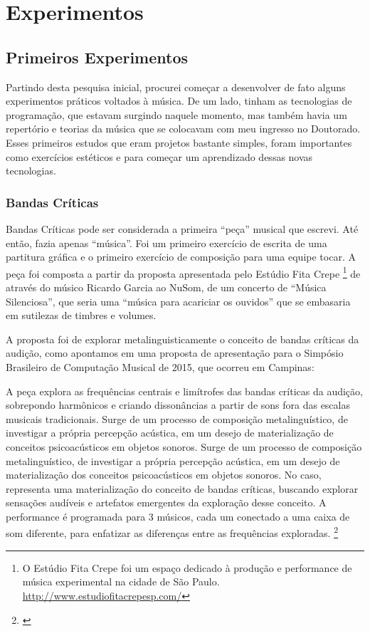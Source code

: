 

\chapter{Experimentos}
\label{ch:experimentos}


\section{Primeiros Experimentos}
Partindo desta pesquisa inicial, procurei começar a desenvolver de fato alguns experimentos práticos voltados à música.  De um lado, tinham as tecnologias de programação, que estavam surgindo naquele momento, mas também havia um repertório e teorias da música que se colocavam com meu ingresso no Doutorado. Esses primeiros estudos que eram projetos bastante simples, foram importantes como exercícios estéticos e para começar um aprendizado dessas novas tecnologias.


\subsection{Bandas Críticas}
Bandas Críticas pode ser considerada a primeira ``peça'' musical que escrevi. Até então, fazia apenas ``música''. Foi um primeiro exercício de escrita de uma partitura gráfica e o primeiro exercício de composição para uma equipe tocar. A peça foi composta a partir da proposta apresentada pelo Estúdio Fita Crepe \footnote{O Estúdio Fita Crepe foi um espaço dedicado à produção e performance de música experimental na cidade de São Paulo. \url{http://www.estudiofitacrepesp.com/}} de através do músico Ricardo Garcia ao NuSom, de um concerto de ``Música Silenciosa'', que seria uma ``música para acariciar os ouvidos'' que se embasaria em sutilezas de timbres e volumes.

A proposta foi de explorar metalinguisticamente o conceito de bandas críticas da audição, como apontamos em uma proposta de apresentação para o Simpósio Brasileiro de Computação Musical de 2015, que ocorreu em Campinas:


\begin{citacao}
A peça explora as frequências centrais e limítrofes das bandas críticas da audição, sobrepondo harmônicos e criando dissonâncias a partir de sons fora das escalas musicais tradicionais. Surge de um processo de composição metalinguístico, de investigar a própria percepção acústica, em um desejo de materialização de conceitos psicoacústicos em objetos sonoros. 
Surge de um processo de composição metalinguístico, de investigar a própria percepção acústica, em um desejo de materialização dos conceitos psicoacústicos em objetos sonoros. No caso, representa uma materialização do conceito de bandas críticas, buscando explorar sensações audíveis e artefatos emergentes da exploração desse conceito. A performance é programada para 3 músicos, cada um conectado a uma caixa de som diferente, para enfatizar as diferenças entre as frequências exploradas. \footnote{\cite{ArianeStolfi2015}}
\end{citacao}

